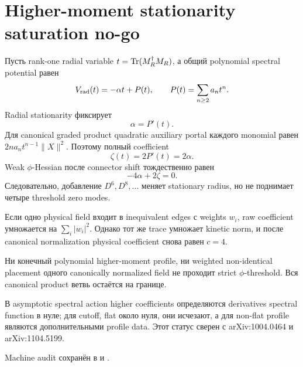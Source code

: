 \section{Higher-moment stationarity saturation no-go}

Пусть rank-one radial variable
\(t=\operatorname{Tr}(M_R^\dagger M_R)\), а общий polynomial spectral potential равен
\begin{equation}
 V_{\rm rad}(t)=-\alpha t+P(t),
 \qquad
 P(t)=\sum_{n\ge2}a_nt^n.
\end{equation}
Radial stationarity фиксирует
\begin{equation}
 \alpha=P'(t).
\end{equation}
Для canonical graded product quadratic auxiliary portal каждого monomial
равен \(2na_nt^{n-1}\|X\|^2\). Поэтому полный coefficient
\begin{equation}
 \boxed{\zeta(t)=2P'(t)=2\alpha.}
\end{equation}
Weak \(\phi\)-Hessian после connector shift тождественно равен
\begin{equation}
 -4\alpha+2\zeta=0.
\end{equation}
Следовательно, добавление \(D^6,D^8,\ldots\) меняет stationary radius, но
не поднимает четыре threshold zero modes.

Если одно physical field входит в inequivalent edges с weights \(w_i\),
raw coefficient умножается на \(\sum_i|w_i|^2\). Однако тот же trace
умножает kinetic norm, и после canonical normalization physical
coefficient снова равен \(c=4\).

\begin{theorem}
Ни конечный polynomial higher-moment profile, ни weighted non-identical
placement одного canonically normalized field не проходит strict
\(\phi\)-threshold. Вся canonical product ветвь остаётся на границе.
\end{theorem}

В asymptotic spectral action higher coefficients определяются derivatives
spectral function в нуле; для cutoff, flat около нуля, они исчезают, а для
non-flat profile являются дополнительными profile data. Этот статус
сверен с arXiv:1004.0464 и arXiv:1104.5199.

Machine audit сохранён в
 и
.